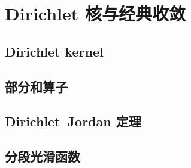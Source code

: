 \section{Dirichlet 核与经典收敛}
\label{b2:sec:0202}


\subsection{Dirichlet kernel}
\label{b2:subsec:020201}

\subsection{部分和算子}
\label{b2:subsec:020202}

\subsection{Dirichlet–Jordan 定理}
\label{b2:subsec:020203}

\subsection{分段光滑函数}
\label{b2:subsec:020204}


